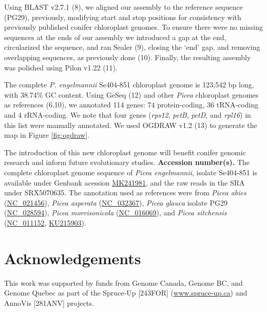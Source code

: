 \documentclass[titlepage,11pt, oneside]{article}   	%
\begin{document}
\newline
\par
Using BLAST v2.7.1 (8), we aligned our assembly to the reference sequence (PG29), previously, modifying start and stop positions for consistency with previously published conifer chloroplast genomes. To ensure there were no missing sequences at the ends of our assembly we introduced a gap at the end, circularized the sequence, and ran Sealer (9), closing the ‘end’ gap, and removing overlapping sequences, as previously done (10). Finally, the resulting assembly was polished using Pilon v1.22 (11).
\newline
\par
The complete \textit{P. engelmannii} Se404-851 chloroplast genome is 123,542 bp long, with 38.74\% GC content. Using GeSeq (12) and other \textit{Picea} chloroplast genomes as references (6,10), we annotated 114 genes: 74 protein-coding, 36 tRNA-coding and 4 rRNA-coding. We note that four genes (\textit{rps12}, \textit{petB}, \textit{petD}, and \textit{rpl16}) in this list were manually annotated. We used OGDRAW v1.2 (13) to generate the map in Figure \ref{fig:ogdraw}.
\newline
\par
The introduction of this new chloroplast genome will benefit conifer genomic research and inform future evolutionary studies.
\newline
\newline
\textbf{Accession number(s).} The complete chloroplast genome sequence of \textit{Picea engelmannii}, isolate Se404-851 is available under Genbank acession \href{https://www.ncbi.nlm.nih.gov/nuccore/MK241981}{MK241981}, and the raw reads in the SRA under SRX5070635. The annotation used as references were from \textit{Picea abies} (\href{https://www.ncbi.nlm.nih.gov/nuccore/NC_021456}{NC\_021456}), \textit{Picea asperata} (\href{https://www.ncbi.nlm.nih.gov/nuccore/NC_032367}{NC\_032367}), \textit{Picea glauca} isolate PG29 (\href{https://www.ncbi.nlm.nih.gov/nuccore/NC_028594}{NC\_028594}), \textit{Picea morrisonicola} (\href{https://www.ncbi.nlm.nih.gov/nuccore/NC_016069}{NC\_016069}), and \textit{Picea sitchensis} (\href{https://www.ncbi.nlm.nih.gov/nuccore/NC_011152}{NC\_011152}, \href{https://www.ncbi.nlm.nih.gov/nuccore/KU215903}{KU215903}).

\section*{Acknowledgements}
This work was supported by funds from Genome Canada, Genome BC, and Genome Quebec as part of the Spruce-Up [243FOR] (\url{www.spruce-up.ca}) and AnnoVis [281ANV] projects.
\end{document}
